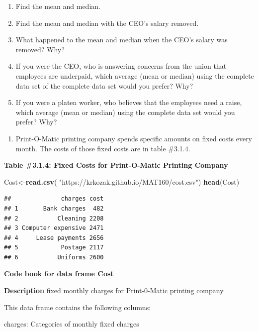 \documentclass[
]{book}
\newenvironment{Shaded}{\begin{snugshade}}{\end{snugshade}}
\newcommand{\KeywordTok}[1]{\textcolor[rgb]{0.13,0.29,0.53}{\textbf{#1}}}
\newcommand{\NormalTok}[1]{#1}
\newcommand{\StringTok}[1]{\textcolor[rgb]{0.31,0.60,0.02}{#1}}
\providecommand{\tightlist}{%
  \setlength{\itemsep}{0pt}\setlength{\parskip}{0pt}}
\begin{document}
\begin{enumerate}
\def\labelenumi{\alph{enumi}.}
\item
  Find the mean and median.
\item
  Find the mean and median with the CEO's salary removed.
\item
  What happened to the mean and median when the CEO's salary was removed? Why?
\item
  If you were the CEO, who is answering concerns from the union that employees are underpaid, which average (mean or median) using the complete data set of the complete data set would you prefer? Why?
\item
  If you were a platen worker, who believes that the employees need a raise, which average (mean or median) using the complete data set would you prefer? Why?
\end{enumerate}

\begin{enumerate}
\def\labelenumi{\arabic{enumi}.}
\setcounter{enumi}{3}
\tightlist
\item
  Print-O-Matic printing company spends specific amounts on fixed costs every month. The costs of those fixed costs are in table \#3.1.4.
\end{enumerate}

\textbf{Table \#3.1.4: Fixed Costs for Print-O-Matic Printing Company}

\begin{Shaded}
\begin{Highlighting}[]
\NormalTok{Cost<-}\KeywordTok{read.csv}\NormalTok{(}
  \StringTok{"https://krkozak.github.io/MAT160/cost.csv"}\NormalTok{)}
\KeywordTok{head}\NormalTok{(Cost)}
\end{Highlighting}
\end{Shaded}

\begin{verbatim}
##              charges cost
## 1       Bank charges  482
## 2           Cleaning 2208
## 3 Computer expensive 2471
## 4     Lease payments 2656
## 5            Postage 2117
## 6           Uniforms 2600
\end{verbatim}

\textbf{Code book for data frame Cost}

\textbf{Description}
fixed monthly charges for Print-0-Matic printing company

This data frame contains the following columns:

charges: Categories of monthly fixed charges
\end{document}
